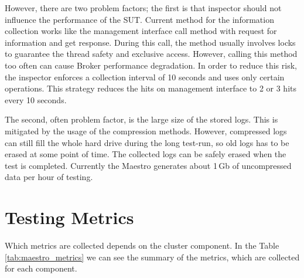
However, there are two problem factors; the first is that inspector should not influence the performance of the SUT. Current method for the information collection works like the management interface call method with request for information and get response. During this call, the method usually involves locks to guarantee the thread safety and exclusive access. However, calling this method too often can cause Broker performance degradation. In order to reduce this risk, the inspector enforces a collection interval of 10 seconds and uses only certain operations. This strategy reduces the hits on management interface to 2 or 3 hits every 10 seconds.

The second, often problem factor, is the large size of the stored logs. This is mitigated by the usage of the compression methods. However, compressed logs can still fill the whole hard drive during the long test-run, so old logs has to be erased at some point of time. The collected logs can be safely erased when the test is completed. Currently the Maestro generates about 1\,Gb of uncompressed data per hour of testing.




\section*{Testing Metrics}
\label{Testing Metrics}
Which metrics are collected depends on the cluster component. In the Table \ref{tab:maestro_metrics} we can see the summary of the metrics, which are collected for each component.

